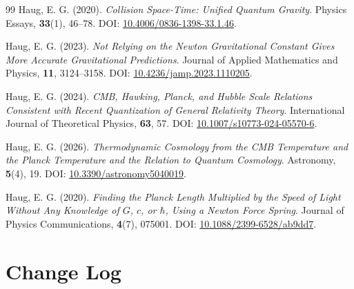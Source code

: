 \documentclass[10pt,a4paper]{article}
\begin{document}
\begin{thebibliography}{99}
	Haug, E. G. (2020).
	\textit{Collision Space-Time: Unified Quantum Gravity}.
	Physics Essays, \textbf{33}(1), 46--78.
	DOI: \href{https://doi.org/10.4006/0836-1398-33.1.46}{10.4006/0836-1398-33.1.46}.
	
	Haug, E. G. (2023).
	\textit{Not Relying on the Newton Gravitational Constant Gives More Accurate Gravitational Predictions}.
	Journal of Applied Mathematics and Physics, \textbf{11}, 3124--3158.
	DOI: \href{https://doi.org/10.4236/jamp.2023.1110205}{10.4236/jamp.2023.1110205}.
	
	Haug, E. G. (2024).
	\textit{CMB, Hawking, Planck, and Hubble Scale Relations Consistent with Recent Quantization of General Relativity Theory}.
	International Journal of Theoretical Physics, \textbf{63}, 57.
	DOI: \href{https://doi.org/10.1007/s10773-024-05570-6}{10.1007/s10773-024-05570-6}.
	
	Haug, E. G. (2026).
	\textit{Thermodynamic Cosmology from the CMB Temperature and the Planck Temperature and the Relation to Quantum Cosmology}.
	Astronomy, \textbf{5}(4), 19.
	DOI: \href{https://doi.org/10.3390/astronomy5040019}{10.3390/astronomy5040019}.
	
	Haug, E. G. (2020).
	\textit{Finding the Planck Length Multiplied by the Speed of Light Without Any Knowledge of $G$, $c$, or $\hbar$, Using a Newton Force Spring}.
	Journal of Physics Communications, \textbf{4}(7), 075001.
	DOI: \href{https://doi.org/10.1088/2399-6528/ab9dd7}{10.1088/2399-6528/ab9dd7}.
	
\end{thebibliography}

\clearpage
\section*{Change Log}
\end{document}
